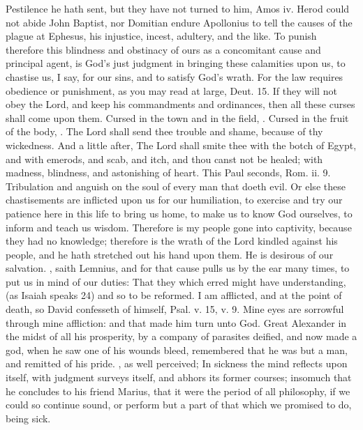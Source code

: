{Pestilence he hath sent, but they have not turned to him, Amos iv. Herod could not abide John Baptist, nor Domitian endure Apollonius to tell the causes of the plague at Ephesus, his injustice, incest, adultery, and the like.
To punish therefore this blindness and obstinacy of ours as a concomitant cause and principal agent, is God's just judgment in bringing these calamities upon us, to chastise us, I say, for our sins, and to satisfy God's wrath.
For the law requires obedience or punishment, as you may read at large, Deut.  15. If they will not obey the Lord, and keep his commandments and ordinances, then all these curses shall come upon them. Cursed in the town and in the field, \etc{}.
Cursed in the fruit of the body, \etc{}.
The Lord shall send thee trouble and shame, because of thy wickedness.
And a little after, The Lord shall smite thee with the botch of Egypt, and with emerods, and scab, and itch, and thou canst not be healed; with madness, blindness, and astonishing of heart.
This Paul seconds, Rom. ii. 9.
Tribulation and anguish on the soul of every man that doeth evil.
Or else these chastisements are inflicted upon us for our humiliation, to exercise and try our patience here in this life to bring us home, to make us to know God ourselves, to inform and teach us wisdom.
Therefore is my people gone into captivity, because they had no knowledge; therefore is the wrath of the Lord kindled against his people, and he hath stretched out his hand upon them.
He is desirous of our salvation.
, saith Lemnius, and for that cause pulls us by the ear many times, to put us in mind of our duties: That they which erred might have understanding, (as Isaiah speaks  24) and so to be reformed.
I am afflicted, and at the point of death, so David confesseth of himself, Psal.  v. 15, v. 9.
Mine eyes are sorrowful through mine affliction: and that made him turn unto God.
Great Alexander in the midst of all his prosperity, by a company of parasites deified, and now made a god, when he saw one of his wounds bleed, remembered that he was but a man, and remitted of his pride.
, as \Pliny{} well perceived; In sickness the mind reflects upon itself, with judgment surveys itself, and abhors its former courses; insomuch that he concludes to his friend Marius, that it were the period of all philosophy, if we could so continue sound, or perform but a part of that which we promised to do, being sick.
}
